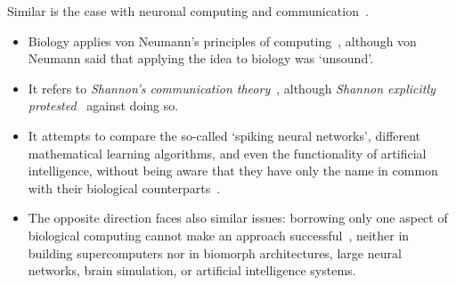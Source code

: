 Similar is the case with neuronal computing and communication~\cite{VeghChannelCapacity:2023}. 
\begin{itemize}
 \item Biology applies von Neumann’s principles of computing~\cite{EDVACreport1945}, although von Neumann said that applying the idea to biology was ‘unsound’. 
  \item It refers to \textit{Shannon’s communication theory}~\cite{ShannonOriginal:1948}, although \textit{Shannon explicitly protested}~\cite{ShannonBandwagon:1956} against doing so.
   \item It attempts to compare the so-called ‘spiking neural networks’, different mathematical learning algorithms, and even the functionality of artificial intelligence, without being aware that they have only the name in common with their biological counterparts~\cite{VeghNeuralShannon:2022}.
    \item The opposite direction faces also similar issues: borrowing only one aspect of biological computing cannot make an approach successful~\cite{VeghTechnomorphBiology:2025}, neither in building supercomputers nor in biomorph architectures, large neural networks, brain simulation, or artificial intelligence systems.
  \end{itemize}

